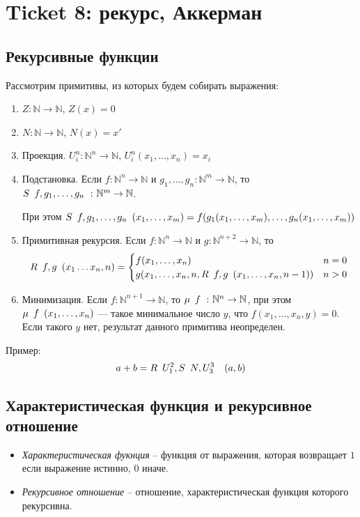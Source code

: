 \section{Ticket 8: рекурс, Аккерман}
\label{sec-10}
\subsection{Рекурсивные функции}
\label{sec-10-1}
Рассмотрим примитивы, из которых будем собирать выражения:

\begin{enumerate}
\item $Z \colon \mathbb{N} \rightarrow \mathbb{N}$, $Z(x) = 0$
\item $N \colon \mathbb{N} \rightarrow \mathbb{N}$, $N(x) = x'$
\item Проекция. $U^n_i \colon \mathbb{N}^n \rightarrow \mathbb{N}$, $U^n_i (x_1, \dotsc, x_n) = x_i$
\item Подстановка. Если $f \colon \mathbb{N}^n \rightarrow \mathbb{N}$ и $g_1, \dotsc, g_n \colon \mathbb{N}^m \rightarrow \mathbb{N}$, 
    то $S\template{f,g_1,\dotsc, g_n} \colon \mathbb{N}^m \rightarrow \mathbb{N}$.

    При этом $S\template{f,g_1,\dotsc, g_n} (x_1,\dotsc, x_m) = f(g_1(x_1,\dotsc, x_m), \dotsc, g_n(x_1,\dotsc, x_m))$
\item Примитивная рекурсия. Если $f \colon \mathbb{N}^n     \to \mathbb{N}$ и 
                                 $g \colon \mathbb{N}^{n+2} \to \mathbb{N}$, то
    \[R\template{f, g}(x_1\ldots{}x_n, n) = \begin{cases}
    	f(x_1, \dotsc, x_n) & n = 0 \\
    	g(x_1, \dotsc, x_n, n, R\ltemplate f, g\rtemplate(x_1, \dotsc, x_n, n - 1)) & n > 0
    \end{cases}\]
\item Минимизация. Если $f \colon \mathbb{N}^{n+1} \rightarrow \mathbb{N}$,
    то $\mu \template{f}\colon \mathbb{N}^n \rightarrow \mathbb{N}$, при этом
  $\mu \template{f} (x_1,\dotsc,x_n)$ --- такое минимальное число $y$, что $f(x_1,\dotsc, x_n, y) = 0$.
  Если такого $y$ нет, результат данного примитива неопределен.
\end{enumerate}

Пример:
\[a + b = R\template{U^2_1, S\template{N, U^3_3}}(a, b)\]
\subsection{Характеристическая функция и рекурсивное отношение}
\label{sec-10-2}
\begin{itemize}
\item \emph{Характеристическая фукнция} -- функция от выражения, которая возвращает $1$ если выражение истинно, $0$ иначе.
\item \emph{Рекурсивное отношение} -- отношение, характеристическая функция
которого рекурсивна.
\end{itemize}
